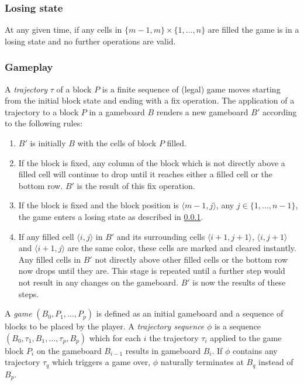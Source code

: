 \subsubsection{Losing state}
\label{subsub:losing}
At any given time, if any cells in $\{m-1, m\} \times \{1, \ldots, n\}$ are filled the game is in a losing state and no further operations are valid.

\subsubsection{Gameplay}
\label{subsub:gameplay}

A \textit{trajectory} $\tau$ of a block $P$ is a finite sequence of (legal) game moves starting from the initial block state and ending with a fix operation. The application of a trajectory to a block $P$ in a gameboard $B$ renders a new gameboard $B'$ according to the following rules:

    \begin{enumerate}
            \item $B'$ is initially $B$ with the cells of block $P$ filled.
            \item If the block is fixed, any column of the block which is not directly above a filled cell will continue to drop until it reaches either a filled cell or the bottom row. $B'$ is the result of this fix operation.
            \item If the block is fixed and the block position is $\langle m-1, j\rangle$, any $j \in \{1, \ldots, n-1\}$, the game enters a losing state as described in \ref{subsub:losing}.
            \item If any filled cell $\langle i,j \rangle$ in $B'$ and its surrounding cells $\langle i+1,j+1 \rangle$, $\langle i, j+1 \rangle$ and $\langle i+1, j \rangle$ are the same color, these cells are marked and cleared instantly. Any filled cells in $B'$ not directly above other filled cells or the bottom row now drops until they are. This stage is repeated until a further step would not result in any changes on the gameboard. $B'$ is now the results of these steps.
    \end{enumerate}

A \textit{game} $(B_0, P_1, \ldots, P_p)$ is defined as an initial gameboard and a sequence of blocks to be placed by the player. A \textit{trajectory sequence} $\phi$ is a sequence $(B_0, \tau_1, B_1, \ldots ,\tau_p, B_p)$ which for each $i$ the trajectory $\tau_i$ applied to the game block $P_i$ on the gameboard $B_{i-1}$ results in gameboard $B_i$. If $\phi$ contains any trajectory $\tau_q$ which triggers a game over, $\phi$ naturally terminates at $B_q$ instead of $B_p$.

